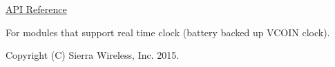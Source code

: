 \hyperlink{pa__rtc_8h}{A\+PI Reference}





For modules that support real time clock (battery backed up V\+C\+O\+IN clock).





Copyright (C) Sierra Wireless, Inc. 2015. 